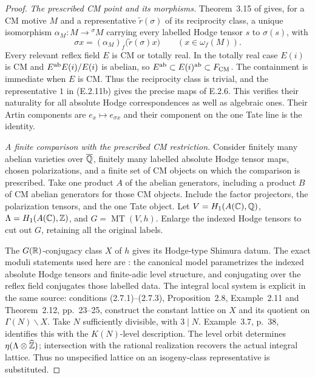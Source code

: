 \begin{proof}
\emph{The prescribed CM point and its morphisms.}
Theorem~3.15 of
\cite[p.~41 in the corrected author version]{GenMilneShimura1994}
gives, for a CM motive $M$ and a representative $\widetilde r(\sigma)$
of its reciprocity class, a unique isomorphism
$\alpha_M:M\to{}^\sigma M$ carrying every labelled Hodge tensor $s$
to $\sigma(s)$, with
\[
 \sigma x=(\alpha_M)_f\bigl(\widetilde r(\sigma)x\bigr)
                  \qquad(x\in\omega_f(M)).
 \tag{E.2.11b}
\]
Every relevant reflex field $E$ is CM or totally real. In the totally
real case $E(i)$ is CM and $E^{\rm ab}E(i)/E(i)$ is abelian, so
$E^{\rm ab}\subset E(i)^{\rm ab}\subset F_{\rm CM}$.
The containment is immediate when $E$ is CM. Thus the reciprocity
class is trivial, and the representative $1$ in (E.2.11b) gives the
precise maps of E.2.6. This verifies their naturality for all
absolute Hodge correspondences as well as algebraic ones.
Their Artin components are $e_x\mapsto e_{\sigma x}$ and their
component on the one Tate line is the identity.

\emph{A finite comparison with the prescribed CM restriction.}
Consider finitely many abelian varieties over $\overline{\mathbb Q}$, finitely many
labelled absolute Hodge tensor maps, chosen polarizations, and a
finite set of CM objects on which the comparison is prescribed.
Take one product $A$ of the abelian generators, including a product
$B$ of CM abelian generators for those CM objects. Include the factor
projectors, the polarization tensors, and the one Tate object.
Let $V=H_1(A(\mathbb C),\mathbb Q)$, $\Lambda=H_1(A(\mathbb C),\mathbb Z)$, and
$G=\operatorname{MT}(V,h)$. Enlarge the indexed Hodge tensors to
cut out $G$, retaining all the original labels.

The $G(\mathbb R)$-conjugacy class $X$ of $h$ gives its Hodge-type Shimura
datum. The exact moduli statements used here are
\cite[Example~3.1, p.~36; Lemma~3.29 and Theorem~3.31,
pp.~45--46]{GenMilneShimura1994}: the canonical model parametrizes
the indexed absolute Hodge tensors and finite-adic level structure,
and conjugating over the reflex field conjugates those labelled
data. The integral local system is explicit in the same source:
conditions (2.7.1)--(2.7.3), Proposition~2.8, Example~2.11 and
Theorem~2.12, pp.~23--25, construct the constant lattice on $X$
and its quotient on $\Gamma(N)\backslash X$. Take $N$ sufficiently
divisible, with $3\mid N$. Example~3.7, p.~38, identifies this with
the $K(N)$-level description. The level orbit determines
$\eta(\Lambda\otimes\widehat{\mathbb Z})$; intersection with the rational
realization recovers the actual integral lattice. Thus no unspecified
lattice on an isogeny-class representative is substituted.


\end{proof}
